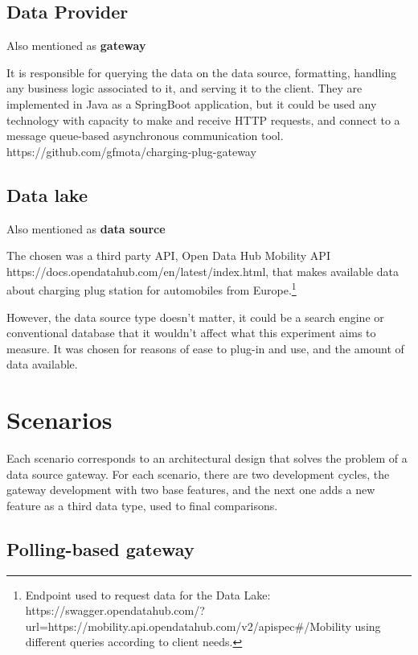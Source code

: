 \subsection*{Data Provider}
\label{sec:dataprovider}

Also mentioned as \textbf{gateway}

It is responsible for querying the data on the data source, formatting, handling any business logic associated to it, and serving it to the client. They are implemented in Java as a SpringBoot application, but it could be used any technology with capacity to make and receive HTTP requests, and connect to a message queue-based asynchronous communication tool. https://github.com/gfmota/charging-plug-gateway

\subsection*{Data lake}
\label{sec:datalake}

Also mentioned as \textbf{data source}

The chosen was a third party API, Open Data Hub Mobility API https://docs.opendatahub.com/en/latest/index.html, that makes available data about charging plug station for automobiles from Europe.\footnote{Endpoint used to request data for the Data Lake: https://swagger.opendatahub.com/?url=https://mobility.api.opendatahub.com/v2/apispec#/Mobility using different queries according to client needs.}

However, the data source type doesn't matter, it could be a search engine or conventional database that it wouldn't affect what this experiment aims to measure. It was chosen for reasons of ease to plug-in and use, and the amount of data available.   

\section{Scenarios}
\label{sec:scenarios}

Each scenario corresponds to an architectural design that solves the problem of a data source gateway. For each scenario, there are two development cycles, the gateway development with two base features, and the next one adds a new feature as a third data type, used to final comparisons.

\subsection*{Polling-based gateway}
\label{sec:polling}

